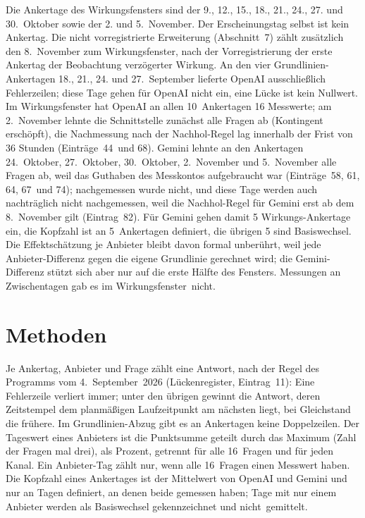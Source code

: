 \documentclass[11pt]{article}
\begin{document}
Die Ankertage des Wirkungsfensters sind der 9., 12., 15., 18., 21., 24., 27. und 30.~Oktober sowie der 2. und 5.~November. Der Erscheinungstag selbst ist kein Ankertag. Die nicht vorregistrierte Erweiterung (Abschnitt~7) zählt zusätzlich den 8.~November zum Wirkungsfenster, nach der Vorregistrierung der erste Ankertag der Beobachtung verzögerter Wirkung. An den vier Grundlinien-Ankertagen 18., 21., 24. und 27.~September lieferte OpenAI ausschließlich Fehlerzeilen; diese Tage gehen für OpenAI nicht ein, eine Lücke ist kein Nullwert. Im Wirkungsfenster hat OpenAI an allen 10~Ankertagen 16 Messwerte; am 2.~November lehnte die Schnittstelle zunächst alle Fragen ab (Kontingent erschöpft), die Nachmessung nach der Nachhol-Regel lag innerhalb der Frist von 36 Stunden (Einträge~44~und 68). Gemini lehnte an den Ankertagen 24.~Oktober, 27.~Oktober, 30.~Oktober, 2.~November und 5.~November alle Fragen ab, weil das Guthaben des Messkontos aufgebraucht war (Einträge~58, 61, 64, 67~und 74); nachgemessen wurde nicht, und diese Tage werden auch nachträglich nicht nachgemessen, weil die Nachhol-Regel für Gemini erst ab dem 8.~November gilt (Eintrag~82). Für Gemini gehen damit 5 Wirkungs-Ankertage ein, die Kopfzahl ist an 5~Ankertagen definiert, die übrigen 5 sind Basiswechsel. Die Effektschätzung je Anbieter bleibt davon formal unberührt, weil jede Anbieter-Differenz gegen die eigene Grundlinie gerechnet wird; die Gemini-Differenz stützt sich aber nur auf die erste Hälfte des Fensters. Messungen an Zwischentagen gab es im Wirkungsfenster~\mbox{nicht.}

\section{Methoden}

Je Ankertag, Anbieter und Frage zählt eine Antwort, nach der Regel des Programms vom 4.~September~2026 (Lückenregister, Eintrag~11): Eine Fehlerzeile verliert immer; unter den übrigen gewinnt die Antwort, deren Zeitstempel dem planmäßigen Laufzeitpunkt am nächsten liegt, bei Gleichstand die frühere. Im Grundlinien-Abzug gibt es an Ankertagen keine Doppelzeilen. Der Tageswert eines Anbieters ist die Punktsumme geteilt durch das Maximum (Zahl der Fragen mal drei), als Prozent, getrennt für alle 16~Fragen und für jeden Kanal. Ein Anbieter-Tag zählt nur, wenn alle 16~Fragen einen Messwert haben. Die Kopfzahl eines Ankertages ist der Mittelwert von OpenAI und Gemini und nur an Tagen definiert, an denen beide gemessen haben; Tage mit nur einem Anbieter werden als Basiswechsel gekennzeichnet und nicht~\mbox{gemittelt.}
\end{document}
